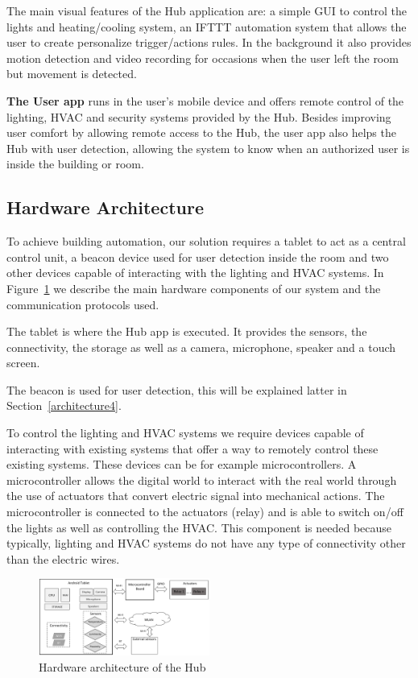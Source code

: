 \documentclass[conference]{IEEEtran}
\begin{document}
The main visual features of the Hub application are: a simple \ac{GUI} to control the lights and heating/cooling system, an \ac{IFTTT} automation system that allows the user to create personalize trigger/actions rules. In the background it also provides motion detection and video recording for occasions when the user left the room but movement is detected.

\textbf{The User app} runs in the user's mobile device and offers remote control of the lighting, \ac{HVAC} and security systems provided by the Hub. Besides improving user comfort by allowing remote access to the Hub, the user app also helps the Hub with user detection, allowing the system to know when an authorized user is inside the building or room.

\subsection{Hardware Architecture}

To achieve building automation, our solution requires a tablet to act as a central control unit, a beacon device used for user detection inside the room and two other devices capable of interacting with the lighting and \ac{HVAC} systems. In Figure~\ref{hard_architecture_system} we describe the main hardware components of our system and the communication protocols used.

The tablet is where the Hub app is executed. It provides the sensors, the connectivity, the storage as well as a camera, microphone, speaker and a touch screen. 

The beacon is used for user detection, this will be explained latter in Section~\ref{architecture4}.

To control the lighting and \ac{HVAC} systems we require devices capable of interacting with existing systems that offer a way to remotely control these existing systems. These devices can be for example microcontrollers. A microcontroller allows the digital world to interact with the real world through the use of actuators that convert electric signal into mechanical actions. The microcontroller is connected to the actuators (relay) and is able to switch on/off the lights as well as controlling the HVAC. This component is needed because typically, lighting and HVAC systems do not have any type of connectivity other than the electric wires. 

\begin{figure}[h]
\centering
\includegraphics[width=0.5\textwidth]{Figures/arch_hardware}
\caption{Hardware architecture of the Hub}
\label{hard_architecture_system}
\end{figure}
\end{document}
